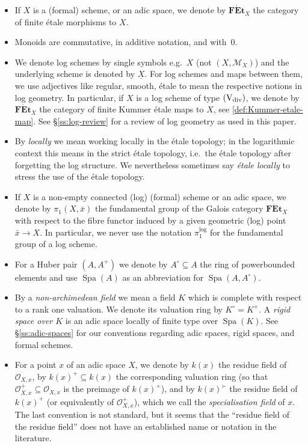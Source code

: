 \documentclass[a4paper,twoside,11pt,reqno]{amsart}
\newcommand{\cM}{{\mathcal M}}
\newcommand{\cO}{{\mathcal O}}
\DeclareMathOperator{\Spa}{Spa}
\newcommand{\cat}[1]{\mathbf{#1}}
\newcommand{\FEt}{\cat{F\acute{E}t}}
\newcommand{\typeVd}{(\mathrm{V}_{\rm div})}
\theoremstyle{definition}
\numberwithin{equation}{subsection}
\begin{document}
\begin{itemize}[leftmargin=*]
    \item 
    If $X$ is a (formal) scheme, or an adic space, we denote by $\FEt_X$ the category of finite \'etale morphisms to $X$. 
    \item 
    Monoids are commutative, in additive notation, and with~$0$.
    \item 
    We denote log schemes by single symbols e.g.~$X$ (not $(X, \cM_X)$) and the underlying scheme is denoted by $\underline{X}$. For log schemes and maps between them, we use adjectives like regular, smooth, \'etale to mean the respective notions in log geometry. In particular, if $X$ is a log scheme of type $\typeVd$, we denote by $\FEt_X$ the category of finite Kummer \'etale maps to $X$, see \cref{def:Kummer-etale-map}. See \S\ref{ss:log-review} for a review of log geometry as used in this paper.

    \item 
    By \emph{locally} we mean working locally in the \'etale topology; in the logarithmic context this means in the strict \'etale topology, i.e.~the \'etale topology after forgetting the log structure. We nevertheless sometimes say \emph{\'etale locally} to stress the use of the \'etale topology.
    
    \item 
    If $X$ is a non-empty connected (log) (formal) scheme or an adic space, we denote by $\pi_1(X,\bar x)$ the fundamental group of the Galois category $\FEt_X$ with respect to the fibre functor induced by a given geometric (log) point $\bar x\to X$. In particular, we never use the notation $\pi_1^{\log}$ for the fundamental group of a log scheme.
    
    \item 
    For a Huber pair $(A,A^+)$ we denote by $A^\circ\subseteq A$ the ring of powerbounded elements and use $\Spa(A)$ as an abbreviation for $\Spa(A,A^\circ)$. 
    
    \item 
    By a \emph{non-archimedean field} we mean a field $K$ which is complete with respect to a rank one valuation. We denote its valuation ring by $K^\circ=K^+$. A \emph{rigid space over $K$} is an adic space locally of finite type over $\Spa(K)$. See \S\ref{ss:adic-spaces} for our conventions regarding adic spaces, rigid spaces, and formal schemes. 
    
    \item 
    For a point $x$ of an adic space $X$, we denote by $k(x)$ the residue field of $\cO_{X, x}$, by $k(x)^+\subseteq k(x)$ the corresponding valuation ring (so that $\cO_{X,x}^+ \subseteq \cO_{X,x}$ is the preimage of $k(x)^+$), and by $k(x)^\succ$ the residue field of $k(x)^+$ (or equivalently of $\cO_{X,x}^+$), which we call the \emph{specialisation field} of $x$. The last convention is not standard, but it seems that the ``residue field of the residue field'' does not have an established name or notation in the literature. 
        

\end{itemize}
\end{document}
